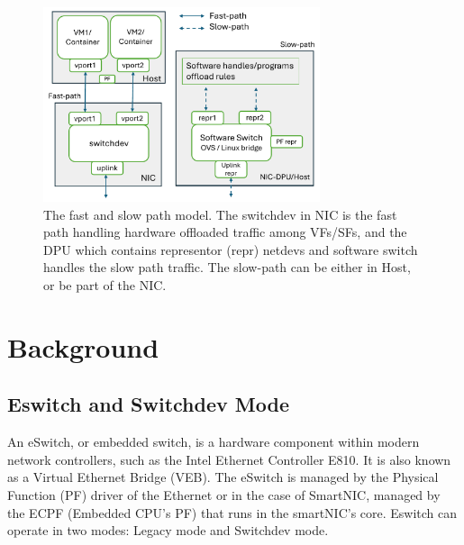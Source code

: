 \documentclass[letterpaper]{article}
\begin{document}
\begin{figure}[t!]
\includegraphics[width=3.2in]{arch.pdf}
\caption{The fast and slow path model. The switchdev in NIC is the fast path handling
hardware offloaded traffic among VFs/SFs, and the DPU which contains representor (repr) netdevs and software switch handles the slow path traffic. The slow-path can be
either in Host, or be part of the NIC.}
\label{fig:arch}
\end{figure}

\section{Background}
\subsection{Eswitch and Switchdev Mode}
An eSwitch, or embedded switch, is a hardware component within modern network
controllers, such as the Intel Ethernet Controller E810. It is also known as
a Virtual Ethernet Bridge (VEB). The eSwitch is managed by the Physical Function (PF)
driver of the Ethernet or in the case of SmartNIC, managed by the ECPF (Embedded
CPU's PF) that runs in the smartNIC's core. Eswitch can operate in two modes:
Legacy mode and Switchdev mode.
\end{document}

